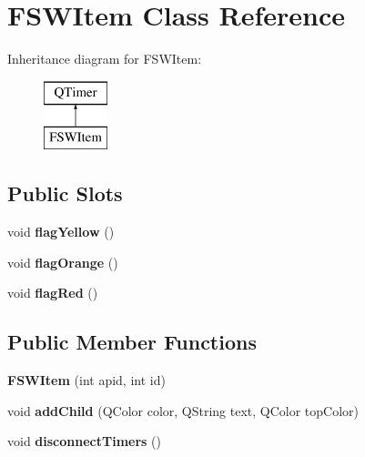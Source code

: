 \hypertarget{class_f_s_w_item}{}\section{F\+S\+W\+Item Class Reference}
\label{class_f_s_w_item}
Inheritance diagram for F\+S\+W\+Item\+:\begin{figure}[H]
\begin{center}
\leavevmode
\includegraphics[height=2.000000cm]{class_f_s_w_item}
\end{center}
\end{figure}
\subsection*{Public Slots}
\begin{DoxyCompactItemize}
\item 
void {\bfseries flag\+Yellow} ()\hypertarget{class_f_s_w_item_acc52e02c28314bbf9a7e98a12ad56162}{}\label{class_f_s_w_item_acc52e02c28314bbf9a7e98a12ad56162}

\item 
void {\bfseries flag\+Orange} ()\hypertarget{class_f_s_w_item_a05d797b563d03bdacbee358dfbb5778c}{}\label{class_f_s_w_item_a05d797b563d03bdacbee358dfbb5778c}

\item 
void {\bfseries flag\+Red} ()\hypertarget{class_f_s_w_item_a2068b63b9ca60ade182b7196f58ac3d5}{}\label{class_f_s_w_item_a2068b63b9ca60ade182b7196f58ac3d5}

\end{DoxyCompactItemize}
\subsection*{Public Member Functions}
\begin{DoxyCompactItemize}
\item 
{\bfseries F\+S\+W\+Item} (int apid, int id)\hypertarget{class_f_s_w_item_ab9b10192b77e8bab50b32c2fa3f30f4a}{}\label{class_f_s_w_item_ab9b10192b77e8bab50b32c2fa3f30f4a}

\item 
void {\bfseries add\+Child} (Q\+Color color, Q\+String text, Q\+Color top\+Color)\hypertarget{class_f_s_w_item_a19d23044c2a111c840752fc230484696}{}\label{class_f_s_w_item_a19d23044c2a111c840752fc230484696}

\item 
void {\bfseries disconnect\+Timers} ()\hypertarget{class_f_s_w_item_abf98dcc7cbe4868777545867cd5bfd3d}{}\label{class_f_s_w_item_abf98dcc7cbe4868777545867cd5bfd3d}

\end{DoxyCompactItemize}
